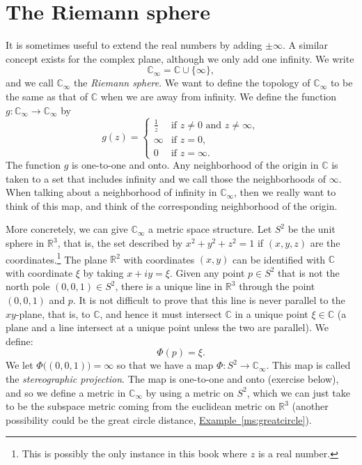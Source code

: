 \documentclass[12pt,openany]{book}
\newcommand{\C}{{\mathbb{C}}}
\newcommand{\R}{{\mathbb{R}}}
\newcommand{\myindex}[1]{#1\index{#1}}
\theoremstyle{plain}
\theoremstyle{remark}
\theoremstyle{definition}
\theoremstyle{exercise}
\theoremstyle{example}
\newcommand{\exampleref}[1]{\hyperref[#1]{Example~\ref*{#1}}}
\begin{document}

\section{The Riemann sphere}

It is sometimes useful to extend the real numbers by adding $\pm \infty$.
A similar concept exists for the complex plane, although
we only add one infinity.  We write
\begin{equation*}
\C_{\infty} = \C \cup \{ \infty \} ,
\end{equation*}
and we call $\C_{\infty}$ the \emph{\myindex{Riemann sphere}}.
We want to define the topology of $\C_\infty$ to be the same as that of $\C$
when we are away from infinity.
We define the function $g \colon \C_\infty \to \C_\infty$ by
\begin{equation*}
g(z) =
\begin{cases}
\frac{1}{z} & \text{if } z \not= 0 \text{ and } z \not= \infty, \\
\infty & \text{if } z = 0, \\
0 & \text{if } z = \infty.
\end{cases}
\end{equation*}
The function $g$ is one-to-one and onto.
Any neighborhood of the origin in $\C$ is taken to a set that
includes infinity and we call those the neighborhoods of
$\infty$.  When talking about a neighborhood of
infinity in $\C_{\infty}$, then we really want to think of this map,
and think of the corresponding neighborhood of the origin.

More concretely, we can give $\C_{\infty}$ a metric space structure.
Let $S^2$ be the unit sphere in $\R^3$,
that is, the set described by $x^2 + y^2 + z^2 = 1$ if $(x,y,z)$ are the
coordinates.\footnote{This is possibly the only instance in this book where
$z$ is a real number.}  The plane $\R^2$ with coordinates $(x,y)$ can be
identified with $\C$ with coordinate $\xi$ by taking $x+iy = \xi$.
Given any point $p \in S^2$ that is not the north pole $(0,0,1) \in S^2$,
there is a unique line in $\R^3$ through the point $(0,0,1)$ and $p$.
It is not difficult to prove that this line is never parallel to the
$xy$-plane, that is, to $\C$, and hence it must intersect $\C$ in a unique
point $\xi \in \C$ (a plane and a line intersect at a unique point unless
the two are parallel).  We define:
\begin{equation*}
\Phi(p) = \xi.
\end{equation*}
We let $\Phi\bigl((0,0,1)\bigr) = \infty$ so that we have a map
$\Phi \colon S^2 \to \C_\infty$.  This map is called the 
\emph{\myindex{stereographic projection}}.
The map is one-to-one and onto (exercise below),
and so we define a metric in $\C_\infty$ by
using a metric on $S^2$, which we can just take to be the subspace
metric coming from the euclidean metric on $\R^3$ (another possibility
could be the great circle distance, \exampleref{ms:greatcircle}).
\end{document}
